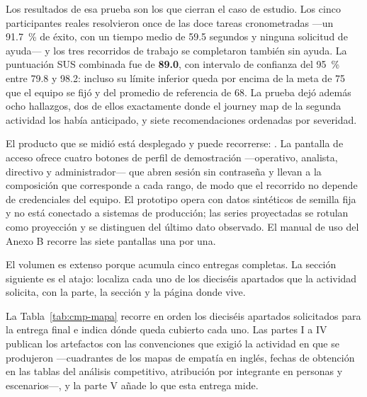 \documentclass[11pt,letterpaper]{article}
\begin{document}
Los resultados de esa prueba son los que cierran el caso de estudio. Los cinco participantes
reales resolvieron once de las doce tareas cronometradas ---un 91.7~\% de éxito, con un tiempo medio de
59.5 segundos y ninguna solicitud de ayuda--- y los tres recorridos de trabajo se completaron
también sin ayuda. La puntuación SUS combinada fue de \textbf{89.0}, con intervalo de confianza
del 95~\% entre 79.8 y 98.2: incluso su límite inferior queda por encima de la meta de 75 que el
equipo se fijó y del promedio de referencia de 68. La prueba dejó además ocho hallazgos, dos de
ellos exactamente donde el journey map de la segunda actividad los había anticipado, y siete
recomendaciones ordenadas por severidad.

El producto que se midió está desplegado y puede recorrerse: \urlDemoWeb. La pantalla de acceso
ofrece cuatro botones de perfil de demostración ---operativo, analista, directivo y
administrador--- que abren sesión sin contraseña y llevan a la composición que corresponde a cada
rango, de modo que el recorrido no depende de credenciales del equipo. El prototipo opera con
datos sintéticos de semilla fija y no está conectado a sistemas de producción; las series
proyectadas se rotulan como proyección y se distinguen del último dato observado. El manual de uso
del Anexo B recorre las siete pantallas una por una.

El volumen es extenso porque acumula cinco entregas completas. La sección siguiente es el atajo:
localiza cada uno de los dieciséis apartados que la actividad solicita, con la parte, la sección y
la página donde vive.

\label{cmp:mapa}

La Tabla~\ref{tab:cmp-mapa} recorre en orden los dieciséis apartados solicitados para la entrega
final e indica dónde queda cubierto cada uno. Las partes I a IV publican los artefactos con las
convenciones que exigió la actividad en que se produjeron ---cuadrantes de los mapas de empatía en
inglés, fechas de obtención en las tablas del análisis competitivo, atribución por integrante en
personas y escenarios---, y la parte V añade lo que esta entrega mide.
\end{document}
